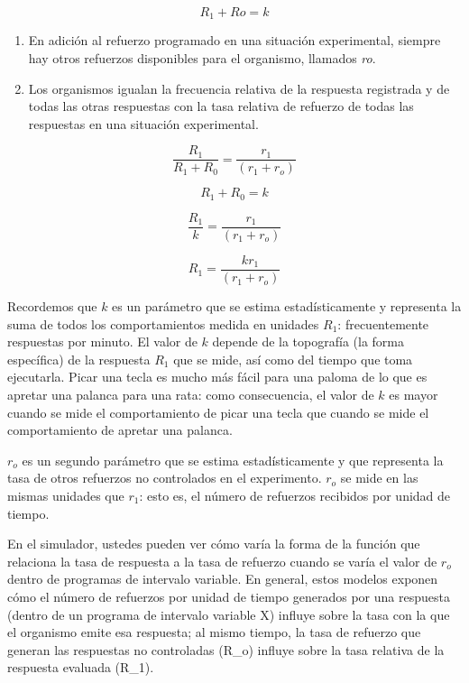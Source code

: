 \documentclass[
  letterpaper,
]{book}
\begin{document}
\[R_1 +Ro = k\]

\begin{enumerate}
\def\labelenumi{\arabic{enumi}.}
\setcounter{enumi}{1}
\item
  En adición al refuerzo programado en una situación experimental,
  siempre hay otros refuerzos disponibles para el organismo, llamados
  \emph{ro}.
\item
  Los organismos igualan la frecuencia relativa de la respuesta
  registrada y de todas las otras respuestas con la tasa relativa de
  refuerzo de todas las respuestas en una situación experimental.
\end{enumerate}

\[\frac{R_1}{R_1 + R_0}= \frac {r_1} {(r_1 + r_o)}\]

\[R_1+R_0 = k\]

\[\frac{R_1}{k}= \frac {r_1} {(r_1 + r_o)}\]

\[R_1= \frac{kr_1} {(r_1 + r_o)}\]

Recordemos que \(k\) es un parámetro que se estima estadísticamente y
representa la suma de todos los comportamientos medida en unidades
\(R_1\): frecuentemente respuestas por minuto. El valor de \(k\) depende
de la topografía (la forma específica) de la respuesta \(R_1\) que se
mide, así como del tiempo que toma ejecutarla. Picar una tecla es mucho
más fácil para una paloma de lo que es apretar una palanca para una
rata: como consecuencia, el valor de \(k\) es mayor cuando se mide el
comportamiento de picar una tecla que cuando se mide el comportamiento
de apretar una palanca.

\(r_o\) es un segundo parámetro que se estima estadísticamente y que
representa la tasa de otros refuerzos no controlados en el experimento.
\(r_o\) se mide en las mismas unidades que \(r_1\): esto es, el número
de refuerzos recibidos por unidad de tiempo.

En el simulador, ustedes pueden ver cómo varía la forma de la función
que relaciona la tasa de respuesta a la tasa de refuerzo cuando se varía
el valor de \(r_o\) dentro de programas de intervalo variable. En
general, estos modelos exponen cómo el número de refuerzos por unidad de
tiempo generados por una respuesta (dentro de un programa de intervalo
variable X) influye sobre la tasa con la que el organismo emite esa
respuesta; al mismo tiempo, la tasa de refuerzo que generan las
respuestas no controladas (R\_o) influye sobre la tasa relativa de la
respuesta evaluada (R\_1).
\end{document}
